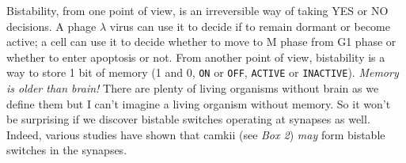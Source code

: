 \documentclass[]{resonance}
\begin{document}
Bistability, from one point of view, is an irreversible way of taking YES or NO
decisions. A phage $\lambda$ virus can use it to decide if to remain dormant or
become active; a cell can use it to decide whether to move to M phase from G1
phase or whether to enter apoptosis or not. From another point of view,
bistability is a way to store 1 bit of memory (1 and 0, \texttt{ON} or
\texttt{OFF}, \texttt{ACTIVE} or \texttt{INACTIVE}). \emph{Memory is older than
brain!} There are plenty of living organisms without brain as we define them but
I can't imagine a living organism without memory. So it won't be surprising if
we discover bistable switches operating at synapses as well. Indeed, various
studies have shown that \gls{camkii} (see \textit{Box 2}) \emph{may} form
bistable switches in the synapses. 

\end{document}
